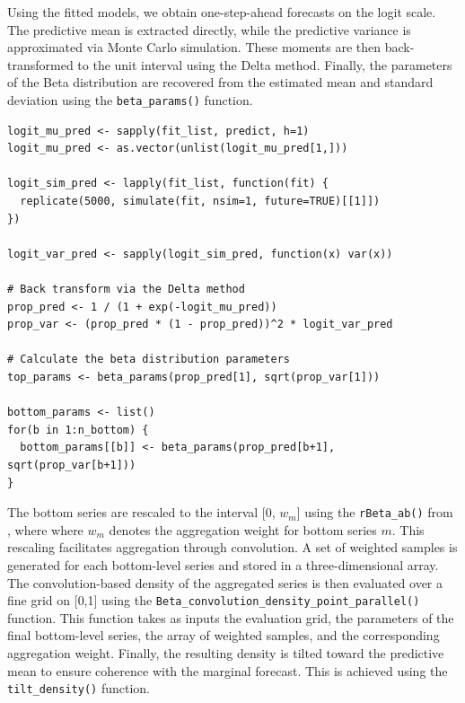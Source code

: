 Using the fitted models, we obtain one-step-ahead forecasts on the logit scale. The predictive mean is extracted directly, while the predictive variance is approximated via Monte Carlo simulation. These moments are then back-transformed to the unit interval using the Delta method. Finally, the parameters of the Beta distribution are recovered from the estimated mean and standard deviation using the \texttt{beta\_params()} function.

\begin{verbatim}
logit_mu_pred <- sapply(fit_list, predict, h=1)
logit_mu_pred <- as.vector(unlist(logit_mu_pred[1,]))

logit_sim_pred <- lapply(fit_list, function(fit) {
  replicate(5000, simulate(fit, nsim=1, future=TRUE)[[1]])
})

logit_var_pred <- sapply(logit_sim_pred, function(x) var(x))

# Back transform via the Delta method
prop_pred <- 1 / (1 + exp(-logit_mu_pred))
prop_var <- (prop_pred * (1 - prop_pred))^2 * logit_var_pred

# Calculate the beta distribution parameters
top_params <- beta_params(prop_pred[1], sqrt(prop_var[1]))

bottom_params <- list()
for(b in 1:n_bottom) {
  bottom_params[[b]] <- beta_params(prop_pred[b+1], sqrt(prop_var[b+1]))
}
\end{verbatim}

The bottom series are rescaled to the interval {[}0, \(w_{m}\){]} using the \texttt{rBeta\_ab()} from , where where \(w_{m}\) denotes the aggregation weight for bottom series \(m\). This rescaling facilitates aggregation through convolution. A set of weighted samples is generated for each bottom-level series and stored in a three-dimensional array. The convolution-based density of the aggregated series is then evaluated over a fine grid on {[}0,1{]} using the \texttt{Beta\_convolution\_density\_point\_parallel()} function. This function takes as inputs the evaluation grid, the parameters of the final bottom-level series, the array of weighted samples, and the corresponding aggregation weight. Finally, the resulting density is tilted toward the predictive mean to ensure coherence with the marginal forecast. This is achieved using the \texttt{tilt\_density()} function.


